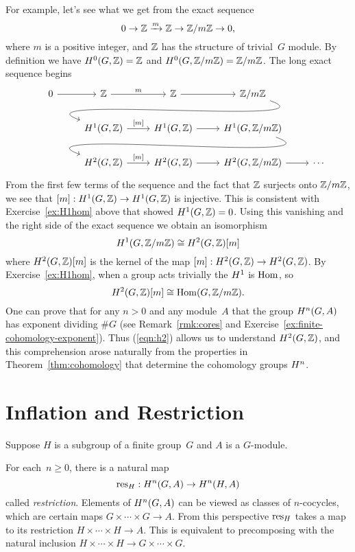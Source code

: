For example, let's see what we get from the exact sequence
\[
  0 \to \mathbb{Z} \xrightarrow{m} \mathbb{Z} \to \mathbb{Z}/m\mathbb{Z} \to 0,
\]
where $m$ is a positive integer, and $\mathbb{Z}$ has the structure of
trivial~$G$ module.  By definition we have
$H^0(G,\mathbb{Z}) = \mathbb{Z}$ and $H^0(G,\mathbb{Z}/m\mathbb{Z})=\mathbb{Z}/m\mathbb{Z}$.
The long exact sequence begins
\[
  \begin{tikzcd}
  0 \rar & \ZZ \rar{m} & \ZZ \rar & \ZZ/m\ZZ \ar[out=-20, in=160]{dll}
  \\
  & \H^1(G,\ZZ) \rar{[m]} & \H^1(G,\ZZ) \rar & \H^1(G,\ZZ/m\ZZ) \ar[out=-20, in=160]{dll}
  \\
  & \H^2(G,\ZZ) \rar{[m]} & \H^2(G,\ZZ) \rar & \H^2(G,\ZZ/m\ZZ) \rar & \cdots
  \end{tikzcd}
\]
From the first few terms of the sequence and the fact
that $\mathbb{Z}$ surjects onto $\mathbb{Z}/m\mathbb{Z}$, we see that
$[m]:H^1(G,\mathbb{Z}) \to H^1(G,\mathbb{Z})$ is injective.
This is consistent with Exercise~\ref{ex:H1hom} above that
showed $H^1(G,\mathbb{Z}) = 0$. Using this vanishing and the right side
of the exact sequence we obtain an isomorphism
\[
  H^1(G,\mathbb{Z}/m\mathbb{Z}) \cong H^2(G,\mathbb{Z})[m]
\]
where $H^2(G,\mathbb{Z})[m]$ is the kernel of the map
$[m]:H^2(G,\mathbb{Z}) \to H^2(G,\mathbb{Z})$.
By Exercise~\ref{ex:H1hom}, when a group acts trivially the $H^1$
is $\operatorname{Hom}$, so
\begin{equation}\label{eqn:h2}
H^2(G,\mathbb{Z})[m] \cong \operatorname{Hom}(G,\mathbb{Z}/m\mathbb{Z}).
\end{equation}
One can prove that for any $n>0$ and any module~$A$ that the group
$H^n(G,A)$ has exponent dividing $\#G$ (see Remark~\ref{rmk:cores}
and Exercise~\ref{ex:finite-cohomology-exponent}).
Thus (\ref{eqn:h2}) allows us to understand $H^2(G,\mathbb{Z})$,
and this comprehension arose naturally from the properties in 
Theorem~\ref{thm:cohomology} that determine the cohomology groups $H^n$.

\section{Inflation and Restriction}

Suppose $H$ is a subgroup of a finite group~$G$ and $A$
is a $G$-module.

For each~$n\geq 0$, there is a natural map
\[
  \operatorname{res}_H : H^n(G,A) \to H^n(H,A)
\]
called \emph{restriction}. Elements of $H^n(G,A)$ can be
viewed as classes of $n$-cocycles, which are certain maps
$G \times \cdots \times G \to A$. From this perspective $\operatorname{res}_H$
takes a map to its restriction $H \times \cdots \times H \to A$.
This is equivalent to precomposing with the natural inclusion
$H\times\cdots\times H \to G\times\cdots\times G$.

